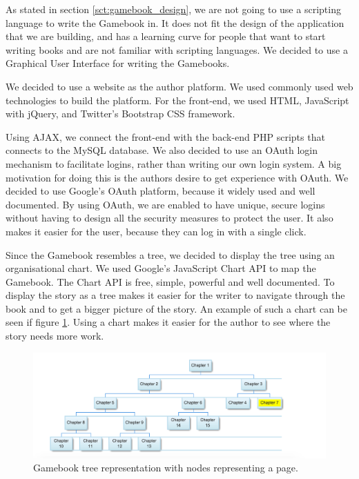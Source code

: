As stated in section \ref{sct:gamebook_design}, we are not going to use a scripting language to write the Gamebook in. It does not fit the design of the application that we are building, and has a learning curve for people that want to start writing books and are not familiar with scripting languages. We decided to use a Graphical User Interface for writing the Gamebooks.

We decided to use a website as the author platform. We used commonly used web technologies to build the platform. For the front-end, we used HTML, JavaScript with jQuery, and Twitter's Bootstrap CSS framework.

Using AJAX, we connect the front-end with the back-end PHP scripts that connects to the MySQL database. We also decided to use an OAuth login mechanism to facilitate logins, rather than writing our own login system. A big motivation for doing this is the authors desire to get experience with OAuth. We decided to use Google's OAuth platform, because it widely used and well documented. By using OAuth, we are enabled to have unique, secure logins without having to design all the security measures to protect the user. It also makes it easier for the user, because they can log in with a single click.

Since the Gamebook resembles a tree, we decided to display the tree using an organisational chart. We used Google's JavaScript Chart API to map the Gamebook. The Chart API is free, simple, powerful and well documented. To display the story as a tree makes it easier for the writer to navigate through the book and to get a bigger picture of the story. An example of such a chart can be seen if figure \ref{fig:gamebook_tree}. Using a chart makes it easier for the author to see where the story needs more work.

\begin{figure}
  \centering
  \caption{Gamebook tree representation with nodes representing a page.} 
    \includegraphics[width=\textwidth]{figs/gamebook_tree.pdf}
   
   \label{fig:gamebook_tree}
\end{figure}


